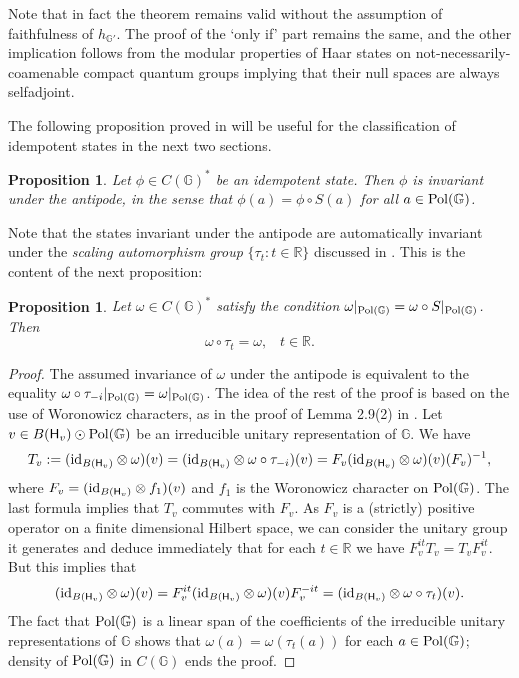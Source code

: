 \documentclass[12pt]{amsart}
\newtheorem{proposition}[theorem]{Proposition}
\theoremstyle{definition}
\theoremstyle{remark}
\numberwithin{equation}{section}
\begin{document}
Note that in fact the theorem remains valid without the assumption of faithfulness of $h_{{\mathbb{G}}'}$. The proof of the `only
if' part remains the same, and the other implication follows from the modular properties of Haar states on
not-necessarily-coamenable compact quantum groups implying that their null spaces are always selfadjoint.

The following proposition proved in  \cite[Section 3]{franz+skalski08a} will be useful for the classification of idempotent
states in the next two sections.

\begin{proposition}\label{prop-antipode}
Let $\phi\in C({\mathbb{G}})^*$ be an idempotent state. Then $\phi$ is invariant
under the antipode, in the sense that $\phi(a)=\phi\circ S(a)$ for all $a\in {{\rm
  Pol}(\mathbb{G})}$.
\end{proposition}

Note that the states invariant under the antipode are automatically invariant under the \emph{scaling automorphism group}
$\{\tau_t:t \in \mathbb{R}\}$ discussed in \cite{woronowicz98}. This is the content of the next proposition:

\begin{proposition} Let $\omega \in C({\mathbb{G}})^*$ satisfy the condition $\omega|_{{\rm
  Pol}(\mathbb{G})} = \omega \circ
S|_{{\rm
  Pol}(\mathbb{G})}$. Then
\[\omega \circ \tau_t = \omega, \;\;\; t \in \mathbb{R}.\]
\end{proposition}

\begin{proof}
The assumed invariance of $\omega$ under the antipode is equivalent to the equality $\omega \circ \tau_{-i}|_{{\rm
  Pol}(\mathbb{G})} =
\omega|_{{\rm
  Pol}(\mathbb{G})}$. The idea of the rest of the proof is based on the use of Woronowicz characters, as in the proof of Lemma
2.9(2) in \cite{tomatsu07}. Let $v \in B(\mathsf{H}_v) \odot {{\rm
  Pol}(\mathbb{G})} $ be an irreducible unitary representation of ${\mathbb{G}}$.
We have
\[ T_v:=(\textup{id}_{B(\mathsf{H}_v)} \otimes \omega)(v) = (\textup{id}_{B(\mathsf{H}_v)} \otimes \omega \circ \tau_{-i})(v) =
F_v (\textup{id}_{B(\mathsf{H}_v)} \otimes \omega)(v)  (F_v)^{-1},\] where $F_v= (\textup{id}_{B(\mathsf{H}_v)} 
\otimes f_1)(v)$ and $f_1$ is the Woronowicz character on ${{\rm
  Pol}(\mathbb{G})}$. The last formula implies that $T_v$ commutes 
with $F_v$. As $F_v$ is a (strictly) positive operator on a finite dimensional Hilbert space, we can consider the 
unitary group it generates and deduce immediately that for each $t \in \mathbb{R}$ we have $F_v^{it} T_v = T_v 
F_v^{it}$. But this implies that
\[ (\textup{id}_{B(\mathsf{H}_v)} \otimes \omega)(v) = F_v^{it} (\textup{id}_{B(\mathsf{H}_v)} \otimes \omega)(v)  F_v^{-it} =
(\textup{id}_{B(\mathsf{H}_v)} \otimes \omega\circ \tau_t)(v).\] The fact that ${{\rm
  Pol}(\mathbb{G})}$ is a linear span of the coefficients
of the irreducible unitary representations of ${\mathbb{G}}$ shows that $\omega(a) = \omega (\tau_t(a))$ for each $a\in {{\rm
  Pol}(\mathbb{G})}$;
density of ${{\rm
  Pol}(\mathbb{G})}$ in $C({\mathbb{G}})$ ends the proof.
\end{proof}
\end{document}
